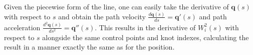 Given the piecewise form of the line, one can easily take the derivative of $\textbf{q}(s)$ with respect to $s$ and obtain the path velocity $\frac{d\textbf{q}(s)}{ds} = \textbf{q}'(s)$ and path acceleration $\frac{d^2\textbf{q}(s)}{ds^2} = \textbf{q}''(s)$. This results in the derivative of $W_{i}^{2}(s)$ with respect to $s$ alongside the same control points and knot indexes, calculating the result in a manner exactly the same as for the position.